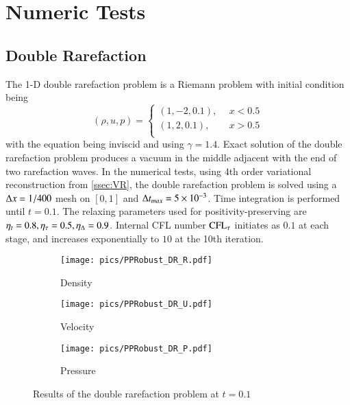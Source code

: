 \documentclass[preprint,12pt]{elsarticle}
\begin{document}
\section{Numeric Tests}

\subsection{Double Rarefaction}

The 1-D double rarefaction problem \cite{hu2004kineticDoubleRare} 
is a Riemann problem with initial condition being
\begin{equation}
    (\rho,u,p) = \left\{
        \begin{array}{ll}
            (1,-2,0.1),\ \ & x < 0.5\\
            (1,2,0.1),\ \ & x > 0.5\\
        \end{array}
    \right.
\end{equation}
with the equation being inviscid and using $\gamma=1.4$.
Exact solution of the double rarefaction problem produces a vacuum 
in the middle adjacent with the end of two rarefaction waves.
In the numerical tests, using 4th order variational reconstruction from \ref{ssec:VR},
the double rarefaction problem is solved using a $\mathrm\Delta x = 1/400$ mesh 
on $[0,1]$ and $\mathrm\Delta t_{max} = 5\times 10^{-3}$. 
Time integration is performed until $t=0.1$.
 The relaxing parameters used 
for positivity-preserving are $\eta_t= 0.8, \eta_\tau=0.5, \eta_\mathrm\Delta=0.9$.
Internal CFL number $\text{CFL}_\tau$ initiates as $0.1$ at each stage, and 
increases exponentially to $10$ at the 10th iteration. 

\begin{figure}[htbp]
    \centering
    \begin{subfigure}{0.33\textwidth}
        \texttt{[image: pics/PPRobust\_DR\_R.pdf]}
        \caption[]{Density}
    \end{subfigure}\hfill
    \begin{subfigure}{0.33\textwidth}
        \texttt{[image: pics/PPRobust\_DR\_U.pdf]}
        \caption[]{Velocity}
    \end{subfigure}\hfill
    \begin{subfigure}{0.33\textwidth}
        \texttt{[image: pics/PPRobust\_DR\_P.pdf]}
        \caption[]{Pressure}
    \end{subfigure}
    \caption{Results of the double rarefaction problem at $t=0.1$}
    \label{fig:doubleRare}
\end{figure}
\end{document}
